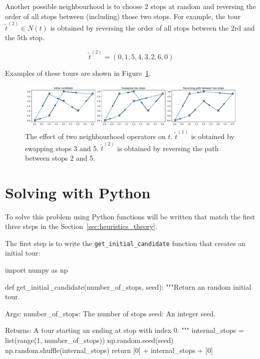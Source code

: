 Another possible neighbourhood is to choose 2 stops at random and reversing the
order of all stops between (including) those two stops. For example, the tour
\(\tilde t^{(2)} \in N(t)\) is obtained by reversing the order of all stops between
the 2rd and the 5th stop.

\[
    \tilde t^{(2)} = (0, 1, 5, 4, 3, 2, 6, 0)
\]

Examples of these tours are shown in
Figure~\ref{fig:tsp-effect-of-neighbourhood-operators}.

\begin{figure}[!hbtp]
    \begin{center}
        \includegraphics[width=\textwidth]{./assets/tsp-effect-of-neighbourhood-operators/main.pdf}
    \end{center}
    \caption{The effect of two neighbourhood operators on \(t\). \(\tilde t^{(1)}\) is
    obtained by swapping stops 3 and 5. \(\tilde t^{(2)}\) is obtained by reversing the
    path between stops 2 and 5.}
    \label{fig:tsp-effect-of-neighbourhood-operators}
\end{figure}

\section{Solving with Python}\label{sec:heuristics_solving-with-python}

To solve this problem using Python functions will be written that match the
first three steps in the Section~\ref{sec:heuristics_theory}.

The first step is to write the \texttt{get_initial_candidate}
function that creates an initial tour:

\begin{pyin}
import numpy as np


def get_initial_candidate(number_of_stops, seed):
    """Return an random initial tour.

    Args:
        number_of_stops: The number of stops
        seed: An integer seed.

    Returns:
        A tour starting an ending at stop with index 0.
    """
    internal_stops = list(range(1, number_of_stops))
    np.random.seed(seed)
    np.random.shuffle(internal_stops)
    return [0] + internal_stops + [0]
\end{pyin}


